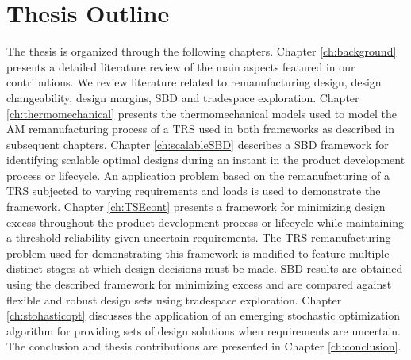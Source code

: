 \section{Thesis Outline}
\label{sec:outline}

The thesis is organized through the following chapters. Chapter \ref{ch:background} presents a detailed literature review of the main aspects featured in our contributions. We review literature related to remanufacturing design, design changeability, design margins, \ac{SBD} and tradespace exploration. Chapter \ref{ch:thermomechanical} presents the thermomechanical models used to model the \ac{AM} remanufacturing process of a \ac{TRS} used in both frameworks as described in subsequent chapters. Chapter \ref{ch:scalableSBD} describes a \ac{SBD} framework for identifying scalable optimal designs during an instant in the product development process or lifecycle. An application problem based on the remanufacturing of a \ac{TRS} subjected to varying requirements and loads is used to demonstrate the framework. Chapter \ref{ch:TSEcont} presents a framework for minimizing design excess throughout the product development process or lifecycle while maintaining a threshold reliability given uncertain requirements. The \ac{TRS} remanufacturing problem used for demonstrating this framework is modified to feature multiple distinct stages at which design decisions must be made. \ac{SBD} results are obtained using the described framework for minimizing excess and are compared against flexible and robust design sets using tradespace exploration. Chapter \ref{ch:stohasticopt} discusses the application of an emerging stochastic optimization algorithm for providing sets of design solutions when requirements are uncertain. The conclusion and thesis contributions are presented in Chapter \ref{ch:conclusion}.